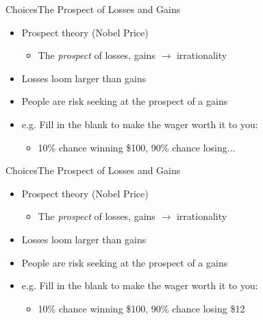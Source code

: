 \documentclass{beamer}
\begin{document}
\begin{frame}{Choices}{The Prospect of Losses and Gains}
  \begin{itemize}
  \addtolength{\itemsep}{0.5\baselineskip}
  \item Prospect theory (Nobel Price) 
        \begin{itemize}
        \item The {\it prospect} of losses, gains $\rightarrow$ irrationality
        \end{itemize}
  \item Losses loom larger than gains
  \item People are risk seeking at the prospect of a gains
  \item e.g. Fill in the blank to make the wager worth it to you:
        \begin{itemize}
        \item 10\% chance winning \$100, 90\% chance losing...
        \end{itemize}
  \end{itemize}

\end{frame}

\begin{frame}{Choices}{The Prospect of Losses and Gains}
  \begin{itemize}
  \addtolength{\itemsep}{0.5\baselineskip}
  \item Prospect theory (Nobel Price) 
        \begin{itemize}
        \item The {\it prospect} of losses, gains $\rightarrow$ irrationality
        \end{itemize}
  \item Losses loom larger than gains
  \item People are risk seeking at the prospect of a gains
  \item e.g. Fill in the blank to make the wager worth it to you:
        \begin{itemize}
        \item 10\% chance winning \$100, 90\% chance losing \$12
        \end{itemize}
  \end{itemize}

\end{frame}
\end{document}
